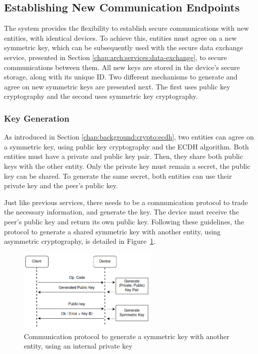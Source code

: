
\subsection{Establishing New Communication Endpoints}\label{chap:arch:services:new-comms}

The system provides the flexibility to establish secure communications with new entities, with identical devices.
To achieve this, entities must agree on a new symmetric key, which can be subsequently used with the secure data exchange service, presented in Section \ref{chap:arch:services:data-exchange}, to secure communications between them.
All new keys are stored in the device's secure storage, along with its unique ID.
Two different mechanisms to generate and agree on new symmetric keys are presented next. The first uses public key cryptography and the second uses symmetric key cryptography.

\subsubsection{Key Generation}\label{chap:arch:services:new-comms:ecdh}

As introduced in Section \ref{chap:background:crypto:ecdh}, two entities can agree on a symmetric key, using public key cryptography and the ECDH algorithm.
Both entities must have a private and public key pair. Then, they share both public keys with the other entity. Only the private key must remain a secret, the public key can be shared. To generate the same secret, both entities can use their private key and the peer's public key.

Just like previous services, there needs to be a communication protocol to trade the necessary information, and generate the key. The device must receive the peer's public key and return its own public key. Following these guidelines, the protocol to generate a shared symmetric key with another entity, using asymmetric cryptography, is detailed in Figure~\ref{fig:protocol:ecdh}.
\begin{figure}[h!]
	\centering
	\includegraphics[width=0.60\textwidth]{./Images/ecdh.png}
	\caption{Communication protocol to generate a symmetric key with another entity, using an internal private key}
	\label{fig:protocol:ecdh}
\end{figure}

